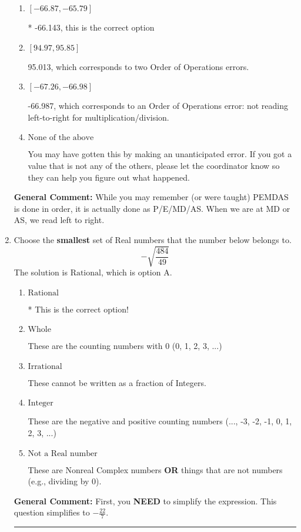 \documentclass{extbook}[14pt]
\newcommand{\litem}[1]{\item #1

\rule{\textwidth}{0.4pt}}
\begin{document}
\begin{enumerate}
{\begin{enumerate}[label=\Alph*.]
 95.857, which corresponds to an Order of Operations error: multiplying by negative before squaring. For example: $(-3)^2 \neq -3^2$
\item \( [-66.87, -65.79] \)

* -66.143, this is the correct option
\item \( [94.97, 95.85] \)

 95.013, which corresponds to two Order of Operations errors.
\item \( [-67.26, -66.98] \)

 -66.987, which corresponds to an Order of Operations error: not reading left-to-right for multiplication/division.
\item \( \text{None of the above} \)

 You may have gotten this by making an unanticipated error. If you got a value that is not any of the others, please let the coordinator know so they can help you figure out what happened.
\end{enumerate}

\textbf{General Comment:} While you may remember (or were taught) PEMDAS is done in order, it is actually done as P/E/MD/AS. When we are at MD or AS, we read left to right.
}
\litem{
Choose the \textbf{smallest} set of Real numbers that the number below belongs to.
\[ -\sqrt{\frac{484}{49}} \]The solution is \( \text{Rational} \), which is option A.\begin{enumerate}[label=\Alph*.]
\item \( \text{Rational} \)

* This is the correct option!
\item \( \text{Whole} \)

These are the counting numbers with 0 (0, 1, 2, 3, ...)
\item \( \text{Irrational} \)

These cannot be written as a fraction of Integers.
\item \( \text{Integer} \)

These are the negative and positive counting numbers (..., -3, -2, -1, 0, 1, 2, 3, ...)
\item \( \text{Not a Real number} \)

These are Nonreal Complex numbers \textbf{OR} things that are not numbers (e.g., dividing by 0).
\end{enumerate}

\textbf{General Comment:} First, you \textbf{NEED} to simplify the expression. This question simplifies to $-\frac{22}{7}$. 
 
}
\end{enumerate}
\end{document}
